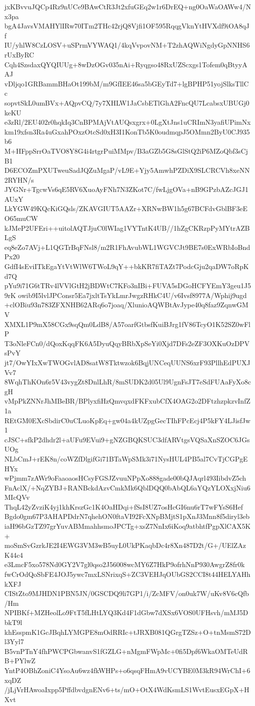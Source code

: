 jxKBvvuJQCp4Rz9nUCe9BAwCtR3Jt2xfuGEq2w1r6DrEQ+ng0OaWaOAWw4/Nx3pa
bgA4JavsVMAHYlIRw70ITm2THc42rjQ8Vjfi1OF595RqqgVknYtHVXdf9iOA8qJf
IU/yhlW8CzLOSV+uSPrmVYWAQ1/4kqVvpovNM+T2zhAQWiNgdyGpNNHS6rUxByRC
Cqh4SzsdaxQYQIUUg+8wDzOGv035nAi+Ryqgso48RxUZScxgs1Tofem0qBtyyAAJ
vDljqo1GRBammBHaOt199bM/m9GfIEE46sa5bGEyTd7+lgBPHP51yojSlksTllCc
sopvtSkL0umBVx+AQpvCQ/7y7XHLW1JaCsbETlGhA2FncQU7LcabsxUBUGj0keKU
e3zRl/2EU402r0hqkIq3CnBPMAjVtAUQsxgrx+0LgXtJns1uCRImN3yafiUPimNx
km19xfsn3Ra4uGxahPOxzOtcSd0xH3I1KonTb5K0oudmqpJ5OMmn2ByU0CJ935b6
M+HFppSrrOaTVO8Y8G4i4rtgrPuiMMpv/B3aGZb5G8sGlStQ2iP6MZoQbf3sCjB1
D6ECOZmPXUTweuSadJQZuMgaP/vL9E+Yjy5AmwhPZDiX9SLCRCVh8xeNN2RYHN/s
JYGNr+TgcwVs6qE5RV6XuoAyFNh7N3ZKot7C/fwLjgOVa+nB9GPzbAZcJGJ1AUxY
LkYGW49KQcKiGQsls/ZKAVGIUT5AAZr+XRNwBW1h5g67BCFdvGblBF3eEO65muCW
kJMeP2UFEri++uitolAQTJjuC0lWIag1VYTntK4UB//1hZgCKRzpPyMYtrAZBLgS
eq8eZo7AVj+L1QGTrBqFNsl8/m2R1FhAvubWL1WGVCJt9BE7s0ExWRbIoBndPx20
GdfI4sEviITkEgaYtVtWlW6TWoL9qY++bkKR7fiTAZt7PodcGju2qaDW7oRpKd7Q
pYu9i71G6tTRv4lVVlGtH2jBDWtC7KFo3nIBi+FUVA5sDGoHCFYEmY3geu1J59rK
owib9I5lvlJPConsr5Ea7jxltTsYkLmrJwgzRHkC4U/v6Ivsf8977A/Wphij9ugd
+clOBiu93n783ZFXNHB62ARq6o7joaq/XlunioAQWBtAvJype40q8faz9ZqnwGMV
XMXL1P9mX58CGx9sqQm0LdB8/A57oarfGtbsfKuiBJrg1fV86TcyO1K52SZ0wFlP
T3oNleFCn0/dQoxKqqFK6A5DyuQqyBRbXpSeYi0Xjd7DFs2eZF3OXKuOzDPVsPvY
jt7/OwYIxXwTWOGvlAD8satW8Tktwzok6BqjUNCeqUUNS6xrF93PllhEdPUXJVv7
8WqhThKOn6r5V43vygZt8DnlLhR/8mSUDK2d05Ul9UgnFsJT7eSdFUAaFyXo8cgH
vMpPkZNNrJhMBeBR/BPlyxfiHzQmvqxdFKFxubCfX4OAG2o2DFtzhzpkzvInfZ1a
REtGM0EXcSbdirC0uCLuoKpEq+gw04a4kUZpgGecTIhFPcEcj4P5kFY4LJisfJw1
cJSC+sfkP2dhdr2l+aUFu9EVui9+gNZGBQKSUC3dfARVtgsVQSaXnSZOC6JGsUOg
NLbCmJ+rEK8n/coWZfDlgifGi71BTaWpSMk3i71NysHUL4PB5al7CvTjCGPgEHYx
wPjmm7zAWr9oFaaoaosHCsyFGSJZvuuNPpXo888gade00bQJAqrl493IibdvZ5ch
FnAclX/+NqZYBJ+RANBckdAzvCmkMk6QblDQQ0bAbQL6aYQzYLOXxjNiu6MIcQVv
ThqL42yZvziK4yj1khKrszGc1K4OaHDqi+fSsI8UZ7osHcGI6nu6rT7wFYsS6Hef
Bgdo0gm67P3AHAPDdrN7qhehON0ftaVI92FcXNpBMjtS1pXnJ3Mnn8f5diryl3eb
iaH96bGzTZ97grYuvABMmahhsmoJPCTg+xsZ7NnIx6iKoq9atbhtfPgpXlCAX5K+
moSmSvGzrkJE2I4EWG3VM3wB5uyL0UkPKaqbDc4r8Xn487D2t/G+/UElZAzK44c4
e3LmcF5xo578Nd0GY2V7gl0qso2J56008wcMY6Z7HkP9ofrhNnP930AwgrZ8fr0k
fwCrOdQoSbFE4JOJ5ywc7mxLSNrixqS+ZC3VEHJqOUbGS2CCI8t44HELYAHhkXFJ
CIStZto9MJHDN1PBN5JN/0GSCDQ9li7GP1/i/ZcMFV/on0uk7W/uKv8V6cQfb/Hm
NPIBKf+MZHeolLo9FtT5fLHtLYQ3Kd4F1dGbw7dXSx6VOS0UFHsvh/mMJ5DbkT9l
khEsspmK1GcJBqhLYMGPE8mOdRRIc+tJRXB081QGrgTZSz+O+tnMsmS72Dl3Yyl7
B5vnPTnY4fhPWCPGbwanvS1fGZLG+nMgmFWpMc+0fi5Dpf6WkaOMTeUdRB+PYlwZ
YntP4OBhZoniC4YsoAu6wz4fkWHPs+o6qsqFHmA9vUCYBE0M3kR94WrChI+6xqDZ
/jLjVrHAwoaIxpp5PffdbvdgnENv6+ts/mO+OtX4WdKsmLS1WvtEusxEGpX+HXvt
